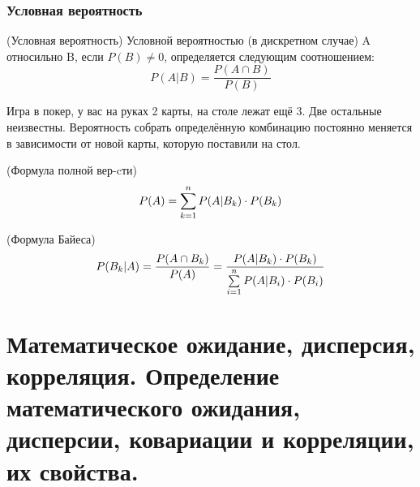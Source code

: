 \begin{multicols}{2}
    \subsubsection*{Условная вероятность}
    \begin{definition}{(Условная вероятность)}{}
            Условной вероятностью (в дискретном случае) A относильно B, если $P(B) \ne 0$, определяется следующим соотношением:
            \[
            P(A|B) = \dfrac{P(A \cap B)}{P(B)}
            \]
    \end{definition}
    \Ex Игра в покер, у вас на руках 2 карты, на столе лежат ещё 3. Две остальные неизвестны. Вероятность собрать определённую комбинацию постоянно меняется в зависимости от новой карты, которую поставили на стол.
    \begin{definition}{(Формула полной вер-cти)}{}
    \[
        P(A) = \sum\limits_{k = 1}^{n}P(A|B_k)\cdot P(B_k)
    \]
    \end{definition}
    \begin{definition}{(Формула Байеса)}{}
            \[
            P(B_k|A) = \dfrac{P(A \cap B_k)}{P(A)} = \dfrac{P(A |B_k) \cdot P(B_k)}{\sum\limits_{i = 1}^{n}P(A|B_i)\cdot P(B_i)}
            \]
    \end{definition}
    \section{Математическое ожидание, дисперсия, корреляция. Определение математического
    ожидания, дисперсии, ковариации и корреляции, их свойства.}

\end{multicols}
